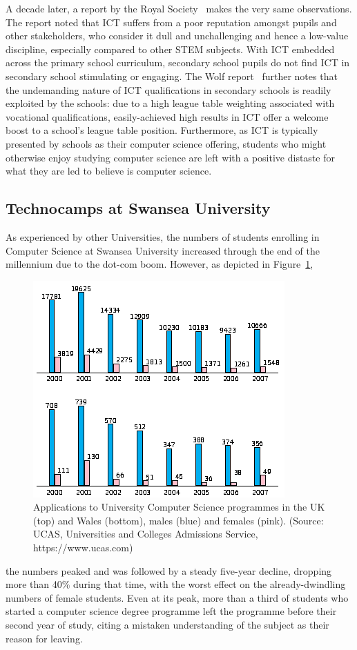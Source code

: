 \documentclass{sig-alternate}
\begin{document}
A decade later, a report by the Royal Society~\cite{RoyalSoc:2012}
makes the very same observations.  The report noted that ICT suffers
from a poor reputation amongst pupils and other stakeholders, who
consider it dull and unchallenging and hence a low-value discipline,
especially compared to other STEM subjects.  With ICT embedded across
the primary school curriculum, secondary school pupils do not find ICT
in secondary school stimulating or engaging.  The Wolf
report~\cite{Wolf:2011} further notes that the undemanding nature of
ICT qualifications in secondary schools is readily exploited by the
schools: due to a high league table weighting associated with
vocational qualifications, easily-achieved high results in ICT offer a
welcome boost to a school's league table position.  Furthermore, as
ICT is typically presented by schools as their computer science
offering, students who might otherwise enjoy studying computer science
are left with a positive distaste for what they are led to believe is
computer science.

\subsection{Technocamps at Swansea University}
As experienced by other Universities,
the numbers of students enrolling in Computer Science
at Swansea University increased through the end
of the millennium due to the dot-com boom.
However, as depicted in Figure~\ref{fig:numbers},
\begin{figure}
  \centering
  \includegraphics[width=0.9\columnwidth]{images/numbers.png}
  \caption{Applications to University Computer Science programmes
           in the UK (top) and Wales (bottom), males (blue) and females (pink).
           (Source: UCAS, Universities and Colleges Admissions Service,
            https://www.ucas.com)}
  \label{fig:numbers}
\end{figure}
the numbers peaked and was followed by
a steady five-year decline, dropping more than 40\% during that time,
with the worst effect on the already-dwindling numbers
of female students.
Even at its peak, more than a third of students who
started a computer science degree programme left
the programme before their second year of study,
citing a mistaken understanding of the subject
as their reason for leaving.
\end{document}
